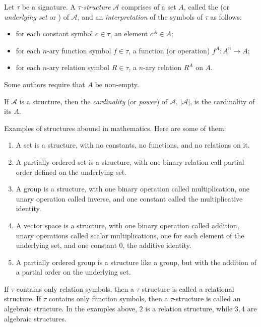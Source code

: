 \documentclass[12pt]{article}
\begin{document}
Let $\tau$ be a signature.
A \emph{$\tau$-structure} $\mathcal{A}$ comprises of a set $A$, called the \emph{} (or \emph{underlying set} or \emph{}) of $\mathcal{A}$, and an \emph{interpretation} of the symbols of $\tau$ as follows:

\begin{itemize}
\item for each constant symbol $c\in\tau$, an
element $c^A\in A$;
\item for each $n$-ary function symbol $f\in\tau$,
a function (or operation) $f^A:A^n\rightarrow A$;
\item for each $n$-ary relation symbol $R\in\tau$, 
a $n$-ary relation $R^A$ on $A$.
\end{itemize}

Some authors require that $A$ be non-empty.

If $\mathcal{A}$ is a structure, then the \emph{cardinality} (or \emph{power}) of $\mathcal{A}$, $|\mathcal{A}|$,  is the cardinality of its  $A$.

Examples of structures abound in mathematics.  Here are some of them:
\begin{enumerate}
\item A set is a structure, with no constants, no functions, and no relations on it.
\item A partially ordered set is a structure, with one binary relation call partial order defined on the underlying set.
\item A group is a structure, with one binary operation called multiplication, one unary operation called inverse, and one constant called the multiplicative identity.
\item A vector space is a structure, with one binary operation called addition, unary operations called scalar multiplications, one for each element of the underlying set, and one constant $0$, the additive identity.
\item A partially ordered group is a structure like a group, but with the addition of a partial order on the underlying set.
\end{enumerate}

If $\tau$ contains only relation symbols, then a $\tau$-structure is called a relational structure.  If $\tau$ contains only function symbols, then a $\tau$-structure is called an algebraic structure.  In the examples above, $2$ is a relation structure, while $3,4$ are algebraic structures.
\end{document}
